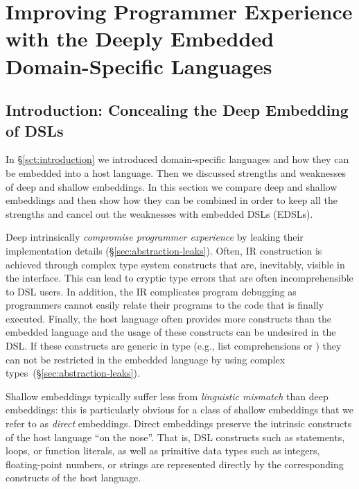 \part{Improving Programmer Experience with the Deeply Embedded Domain-Specific Languages}

\chapter{Introduction: Concealing the Deep Embedding of DSLs}
\label{sec:introduction-yy}
In \S \ref{sct:introduction} we introduced domain-specific languages and how they can
 be embedded into a host language. Then we discussed strengths and weaknesses of deep and shallow embeddings.
 In this section we compare deep and shallow embeddings and then show how they can
 be combined in order to keep all the strengths and cancel out the weaknesses with
 embedded DSLs (EDSLs).



Deep \edsls{} intrinsically \emph{compromise programmer experience} by leaking their
implementation details (\S \ref{sec:abstraction-leaks}). Often, IR construction
is achieved through complex type system constructs that are, inevitably,
visible in the \edsl interface. This can lead to cryptic type errors
that are often incomprehensible to DSL users.
In addition, the IR complicates program debugging as programmers cannot easily
relate their programs to the code that is finally executed. Finally, the host
language often provides more constructs than the embedded language and the usage
of these constructs can be undesired in the DSL. If these constructs are generic in type
(e.g., list comprehensions or ) they can not be restricted in the embedded
language by using complex types~(\S \ref{sec:abstraction-leaks}).


Shallow embeddings typically suffer less from \emph{linguistic mismatch} than deep embeddings:
 this is particularly obvious for a class of shallow embeddings that we refer to
 as \emph{direct} embeddings. Direct embeddings preserve the intrinsic constructs
 of the host language ``on the nose''. That is, DSL
 constructs such as  statements, loops, or function literals, as well
 as primitive data types such as integers, floating-point numbers, or strings
 are represented directly by the corresponding constructs of the host language.

